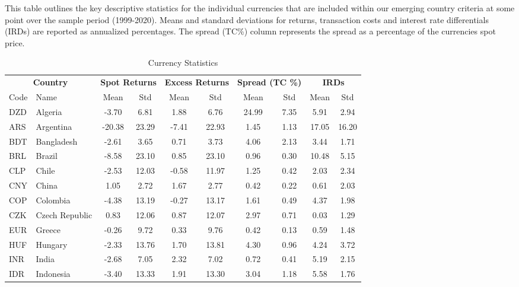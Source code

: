 \documentclass{article}
\begin{document}
\begin{table}[htbp]
  \centering
  \caption{Currency Statistics}
  This table outlines the key descriptive statistics for the individual currencies that are included within our emerging country criteria at some point over the sample period (1999-2020). Means and standard deviations for returns, transaction costs and interest rate differentials (IRDs) are reported as annualized percentages. The spread (TC\%) column represents the spread as a percentage of the currencies spot price. 
  
    \begin{tabular}{llcccccccc}
          &       &       &       &       &       &       &       &       &  \\
    \midrule
    \multicolumn{2}{c}{\textbf{Country}} & \multicolumn{2}{c}{\textbf{Spot Returns}} & \multicolumn{2}{c}{\textbf{Excess Returns}} & \multicolumn{2}{c}{\textbf{Spread (TC \%)}} & \multicolumn{2}{c}{\textbf{IRDs}} \\
    \midrule
    Code  & Name  & Mean  & Std   & Mean  & Std   & Mean  & Std   & Mean  & Std \\
    \midrule
    DZD   & Algeria & -3.70 & 6.81  & 1.88  & 6.76  & 24.99 & 7.35  & 5.91  & 2.94 \\
    ARS   & Argentina & -20.38 & 23.29 & -7.41 & 22.93 & 1.45  & 1.13  & 17.05 & 16.20 \\
    BDT   & Bangladesh & -2.61 & 3.65  & 0.71  & 3.73  & 4.06  & 2.13  & 3.44  & 1.71 \\
    BRL   & Brazil & -8.58 & 23.10 & 0.85  & 23.10 & 0.96  & 0.30  & 10.48 & 5.15 \\
    CLP   & Chile & -2.53 & 12.03 & -0.58 & 11.97 & 1.25  & 0.42  & 2.03  & 2.34 \\
    CNY   & China & 1.05  & 2.72  & 1.67  & 2.77  & 0.42  & 0.22  & 0.61  & 2.03 \\
    COP   & Colombia & -4.38 & 13.19 & -0.27 & 13.17 & 1.61  & 0.49  & 4.37  & 1.98 \\
    CZK   & Czech Republic & 0.83  & 12.06 & 0.87  & 12.07 & 2.97  & 0.71  & 0.03  & 1.29 \\
    EUR   & Greece & -0.26 & 9.72  & 0.33  & 9.76  & 0.42  & 0.13  & 0.59  & 1.48 \\
    HUF   & Hungary & -2.33 & 13.76 & 1.70  & 13.81 & 4.30  & 0.96  & 4.24  & 3.72 \\
    INR   & India & -2.68 & 7.05  & 2.32  & 7.02  & 0.72  & 0.41  & 5.19  & 2.15 \\
    IDR   & Indonesia & -3.40 & 13.33 & 1.91  & 13.30 & 3.04  & 1.18  & 5.58  & 1.76 \\

\end{tabular}
\end{table}
\end{document}
